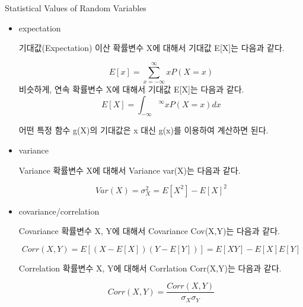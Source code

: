 \documentclass{beamer}
\begin{document}
\begin{frame}[allowframebreaks]{Statistical Values of Random Variables}

\begin{itemize} 
\item expectation

\begin{block}{기대값(Expectation)} 
이산 확률변수 X에 대해서 기대값 E[X]는 다음과 같다. 

\begin{equation} 
E[x] = \sum_{x = -\infty}^{\infty} xP(X=x)
\end{equation}
비슷하게, 연속 확률변수 X에 대해서 기대값 E[X]는 다음과 같다. 
\begin{equation} 
E[X] = \int_{-\infty}{^\infty} xP(X=x)dx 
\end{equation}
\end{block}

어떤 특정 함수 g(X)의 기대값은 x 대신 g(x)를 이용하여 계산하면 된다. 

\item variance

\begin{block}{Variance} 
확률변수 X에 대해서 Variance var(X)는 다음과 같다. 

\begin{equation} 
Var(X) = \sigma_X^2= E[X^2] - E[X]^2
\end{equation}
\end{block}


\item covariance/correlation 

\begin{block}{Covariance} 
확률변수 X, Y에 대해서 Covariance Cov(X,Y)는 다음과 같다. 

\begin{equation} 
Corr(X,Y) = E[(X-E[X])(Y-E[Y])] = E[XY] - E[X]E[Y]
\end{equation}


\end{block}

\begin{block}{Correlation} 
확률변수 X, Y에 대해서 Corrlation Corr(X,Y)는 다음과 같다. 

\begin{equation} 
Corr(X,Y) = \frac{Corr(X,Y)}{\sigma_X \sigma_Y}
\end{equation}
\end{block}

\end{itemize}

\end{frame}
\end{document}
